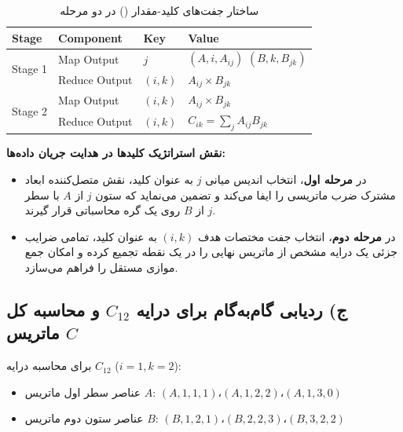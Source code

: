 \documentclass[11pt,a4paper]{article}
\begin{document}
	\begin{table}[H]
		\centering
		\small
		\renewcommand{\arraystretch}{1.35}
		\caption{ساختار جفت‌های کلید-مقدار () در دو مرحله }
		\vspace{0.15cm}
		\begin{latin}
			\begin{tabular}{llll}
				\toprule
				\rowcolor{headerBg}
				\textbf{Stage} & \textbf{Component} & \textbf{Key} & \textbf{Value} \\
				\midrule
				\multirow{2}{*}{Stage 1} & Map Output & $j$ & $(A, i, A_{ij})$ \text{or} $(B, k, B_{jk})$ \\
				& Reduce Output & $(i, k)$ & $A_{ij} \times B_{jk}$ \\
				\midrule
				\multirow{2}{*}{Stage 2} & Map Output & $(i, k)$ & $A_{ij} \times B_{jk}$ \\
				& Reduce Output & $(i, k)$ & $C_{ik} = \sum_{j} A_{ij} B_{jk}$ \\
				\bottomrule
			\end{tabular}
		\end{latin}
	\end{table}
	
	\textbf{نقش استراتژیک کلیدها در هدایت جریان داده‌ها:}
	\begin{itemize}
		\item در \textbf{مرحله اول}، انتخاب اندیس میانی $j$ به عنوان کلید، نقش متصل‌کننده ابعاد مشترک ضرب ماتریسی را ایفا می‌کند و تضمین می‌نماید که ستون $j$ از $A$ با سطر $j$ از $B$ روی یک گره محاسباتی قرار گیرند.
		\item در \textbf{مرحله دوم}، انتخاب جفت مختصات هدف $(i, k)$ به عنوان کلید، تمامی ضرایب جزئی یک درایه مشخص از ماتریس نهایی را در یک نقطه تجمیع کرده و امکان جمع موازی مستقل را فراهم می‌سازد.
	\end{itemize}
	
	\subsection{ج) ردیابی گام‌به‌گام برای درایه $C_{12}$ و محاسبه کل ماتریس $C$}
	
	برای محاسبه درایه $C_{12}$ ($i=1, k=2$):
	\begin{itemize}
		\item عناصر سطر اول ماتریس $A$: $(A, 1, 1, 1)، (A, 1, 2, 2)، (A, 1, 3, 0)$
		\item عناصر ستون دوم ماتریس $B$: $(B, 1, 2, 1)، (B, 2, 2, 3)، (B, 3, 2, 2)$
	\end{itemize}
	
\end{document}
